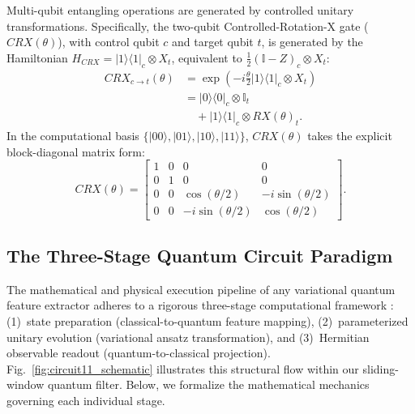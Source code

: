 \documentclass[pdflatex,sn-mathphys-num]{sn-jnl}%
\theoremstyle{thmstyleone}%
\theoremstyle{thmstyletwo}%
\theoremstyle{thmstylethree}%
\begin{document}
Multi-qubit entangling operations are generated by controlled unitary transformations. Specifically, the two-qubit Controlled-Rotation-X gate ($CRX(\theta)$), with control qubit $c$ and target qubit $t$, is generated by the Hamiltonian $H_{CRX} = |1\rangle\langle 1|_c \otimes X_t$, equivalent to $\frac{1}{2}(\mathbb{I} - Z)_c \otimes X_t$:
\begin{align}
CRX_{c \to t}(\theta) &= \exp\left(-i \frac{\theta}{2} |1\rangle\langle 1|_c \otimes X_t \right) \nonumber \\
&= |0\rangle\langle 0|_c \otimes \mathbb{I}_t \nonumber \\
&\quad + |1\rangle\langle 1|_c \otimes RX(\theta)_t.
\label{eq:crx_matrix}
\end{align}
In the computational basis $\{|00\rangle, |01\rangle, |10\rangle, |11\rangle\}$, $CRX(\theta)$ takes the explicit block-diagonal matrix form:
\begin{equation}
CRX(\theta) = \begin{bmatrix} 
1 & 0 & 0 & 0 \\ 
0 & 1 & 0 & 0 \\ 
0 & 0 & \cos(\theta/2) & -i\sin(\theta/2) \\ 
0 & 0 & -i\sin(\theta/2) & \cos(\theta/2) 
\end{bmatrix}.
\label{eq:crx_explicit_matrix}
\end{equation}

\subsection{The Three-Stage Quantum Circuit Paradigm}
\label{subsec:three_stage_paradigm}
The mathematical and physical execution pipeline of any variational quantum feature extractor adheres to a rigorous three-stage computational framework \cite{schuld2021machine}: (1)~state preparation (classical-to-quantum feature mapping), (2)~parameterized unitary evolution (variational ansatz transformation), and (3)~Hermitian observable readout (quantum-to-classical projection). Fig.~\ref{fig:circuit11_schematic} illustrates this structural flow within our sliding-window quantum filter. Below, we formalize the mathematical mechanics governing each individual stage.
\end{document}
